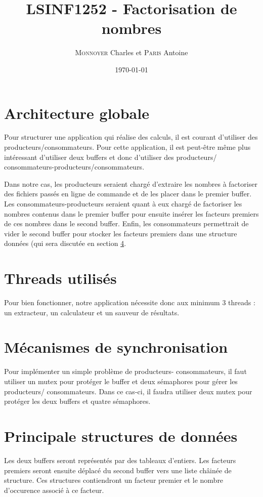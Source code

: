 \documentclass{scrartcl}
\title{LSINF1252 - Factorisation de nombres}
\author{\textsc{Monnoyer} Charles et \textsc{Paris} Antoine}
\date{\today}
\begin{document}
\maketitle

\section{Architecture globale}
Pour structurer une application qui réalise des calculs,
il est courant d'utiliser des producteurs/consommateurs\cite{syll}.
Pour cette application, il est peut-être même plus intéressant
d'utiliser deux buffers et donc d'utiliser des producteurs/
consommateurs-producteurs/consommateurs.

Dans notre cas, les producteurs seraient chargé d'extraire
les nombres à factoriser des fichiers passés en ligne
de commande et de les placer dans le premier buffer. Les
consommateurs-producteurs seraient quant à eux chargé de
factoriser les nombres contenus dans le premier buffer pour
ensuite insérer les facteurs premiers de ces nombres
dans le second buffer. Enfin, les consommateurs
permettrait de vider le second buffer pour stocker les
facteurs premiers dans une structure données (qui sera
discutée en section \ref{sec:data-structure}.


\section{Threads utilisés}
Pour bien fonctionner, notre application nécessite donc
aux minimum 3 threads : un extracteur, un calculateur et
un sauveur de résultats.

\section{Mécanismes de synchronisation}
Pour implémenter un simple problème de producteurs-
consommateurs, il faut utiliser un mutex pour protéger
le buffer et deux sémaphores pour gérer les producteurs/
consommateurs. Dans ce cas-ci, il faudra utiliser deux
mutex pour protéger les deux buffers et quatre sémaphores.

\section{Principale structures de données}
\label{sec:data-structure}
Les deux buffers seront représentés par des tableaux d'entiers.
Les facteurs premiers seront ensuite déplacé du second
buffer vers une liste châinée de structure.
Ces structures contiendront un facteur premier et le
nombre d'occurence associé à ce facteur.
\end{document}
